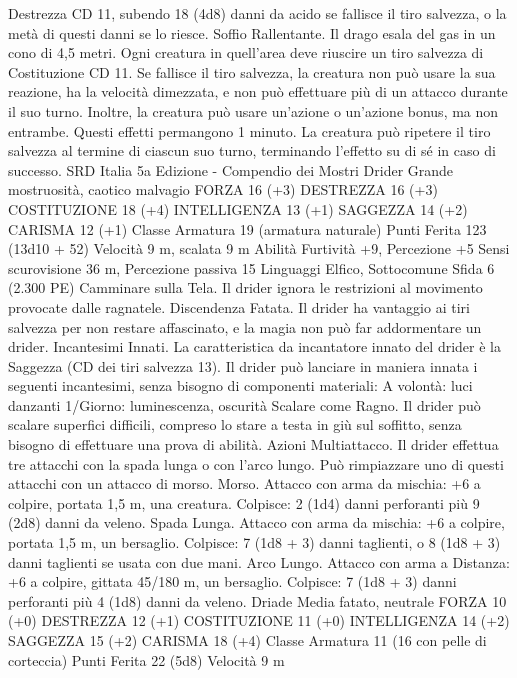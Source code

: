 \begin{multicols}{2}
Destrezza CD 11, subendo 18 (4d8) danni da acido se fallisce il tiro
salvezza, o la metà di questi danni se lo riesce.
Soffio Rallentante. Il drago esala del gas in un cono di 4,5 metri.
Ogni creatura in quell’area deve riuscire un tiro salvezza di
Costituzione CD 11. Se fallisce il tiro salvezza, la creatura non può
usare la sua reazione, ha la velocità dimezzata, e non può effettuare
più di un attacco durante il suo turno. Inoltre, la creatura può usare
un’azione o un’azione bonus, ma non entrambe. Questi effetti
permangono 1 minuto. La creatura può ripetere il tiro salvezza al
termine di ciascun suo turno, terminando l’effetto su di sé in caso di
successo.
SRD Italia 5a Edizione - Compendio dei Mostri
Drider
Grande mostruosità, caotico malvagio
FORZA 16 (+3)
DESTREZZA 16 (+3)
COSTITUZIONE 18 (+4)
INTELLIGENZA 13 (+1)
SAGGEZZA 14 (+2)
CARISMA 12 (+1)
Classe Armatura 19 (armatura naturale)
Punti Ferita 123 (13d10 + 52)
Velocità 9 m, scalata 9 m
Abilità Furtività +9, Percezione +5
Sensi scurovisione 36 m, Percezione passiva 15
Linguaggi Elfico, Sottocomune
Sfida 6 (2.300 PE)
Camminare sulla Tela. Il drider ignora le restrizioni al
movimento provocate dalle ragnatele.
Discendenza Fatata. Il drider ha vantaggio ai tiri salvezza per
non restare affascinato, e la magia non può far addormentare un
drider.
Incantesimi Innati. La caratteristica da incantatore innato del
drider è la Saggezza (CD dei tiri salvezza 13). Il drider può
lanciare in maniera innata i seguenti incantesimi, senza bisogno
di componenti materiali:
A volontà: luci danzanti
1/Giorno: luminescenza, oscurità
Scalare come Ragno. Il drider può scalare superfici difficili,
compreso lo stare a testa in giù sul soffitto, senza bisogno di
effettuare una prova di abilità.
Azioni
Multiattacco. Il drider effettua tre attacchi con la spada lunga o
con l’arco lungo. Può rimpiazzare uno di questi attacchi con un
attacco di morso.
Morso. Attacco con arma da mischia: +6 a colpire, portata 1,5
m, una creatura.
Colpisce: 2 (1d4) danni perforanti più 9 (2d8) danni da veleno.
Spada Lunga. Attacco con arma da mischia: +6 a colpire,
portata 1,5 m, un bersaglio.
Colpisce: 7 (1d8 + 3) danni taglienti, o 8 (1d8 + 3) danni
taglienti se usata con due mani.
Arco Lungo. Attacco con arma a Distanza: +6 a colpire, gittata
45/180 m, un bersaglio.
Colpisce: 7 (1d8 + 3) danni perforanti più 4 (1d8) danni da
veleno.
Driade
Media fatato, neutrale
FORZA 10 (+0)
DESTREZZA 12 (+1)
COSTITUZIONE 11 (+0)
INTELLIGENZA 14 (+2)
SAGGEZZA 15 (+2)
CARISMA 18 (+4)
Classe Armatura 11 (16 con pelle di corteccia)
Punti Ferita 22 (5d8)
Velocità 9 m

\end{multicols}

